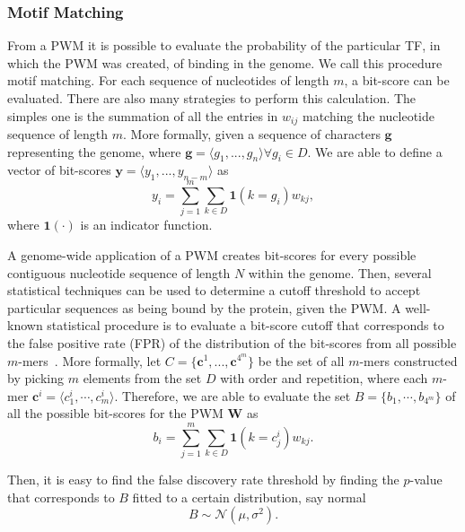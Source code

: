 \subsubsection{Motif Matching}

From a PWM it is possible to evaluate the probability of the particular TF, in which the PWM was created, of binding in the genome. We call this procedure motif matching. For each sequence of nucleotides of length $ m $, a bit-score can be evaluated. There are also many strategies to perform this calculation. The simples one is the summation of all the entries in $ w_{ij} $ matching the nucleotide sequence of length $ m $. More formally, given a sequence of characters $\mathbf{g}$ representing the genome, where $\mathbf{g} = \langle{g}_{1}, ..., {g}_{n}\rangle \forall {g}_{i} \in D$. We are able to define a vector of bit-scores $\mathbf{y} = \langle{y}_{1}, ..., {y}_{n-m}\rangle$ as
\begin{equation}
  \label{eq:motif.match}
  {y}_{i} = \sum_{j=1}^{m} \sum_{k \in D} {\mathbf{1}}(k={g}_{i}){w}_{kj},
\end{equation}
where ${\mathbf{1}}(\cdot)$ is an indicator function. 

A genome-wide application of a PWM creates bit-scores for every possible contiguous nucleotide sequence of length $ N $ within the genome. Then, several statistical techniques can be used to determine a cutoff threshold to accept particular sequences as being bound by the protein, given the PWM. A well-known statistical procedure is to evaluate a bit-score cutoff that corresponds to the false positive rate (FPR) of the distribution of the bit-scores from all possible $m$-mers~\cite{wilczynski2009}. More formally, let $C = \{\mathbf{c}^{1}, ..., \mathbf{c}^{4^m}\}$ be the set of all $m$-mers constructed by picking $ m $ elements from the set $ D $ with order and repetition, where each $m$-mer $\mathbf{c}^{i} = \langle{c}^{i}_{1}, \cdots, {c}^{i}_{m}\rangle$. Therefore, we are able to evaluate the set $ B = \{ {b}_{1}, \cdots, {b}_{4^m} \} $ of all the possible bit-scores for the PWM $\mathbf{W}$ as
\begin{equation}
  \label{eq:pwm.cutoff1}
  {b}_{i} = \sum_{j=1}^{m} \sum_{k \in D} {\mathbf{1}}(k={c}^{i}_{j}){w}_{kj}.
\end{equation}

Then, it is easy to find the false discovery rate threshold by finding the $p$-value that corresponds to $ B $ fitted to a certain distribution, say normal
\begin{equation}
  \label{eq:pwm.cutoff2}
  B \sim \mathcal{N}({\mu},{\sigma}^{2}).
\end{equation}

